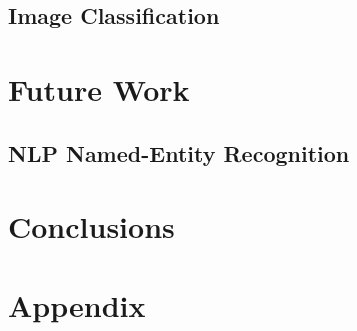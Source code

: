 \documentclass{article}
\numberwithin{equation}{section}
\begin{document}
\subsection{Image Classification}

\newpage
\section{Future Work}
\subsection{NLP Named-Entity Recognition}

\newpage
\section{Conclusions}

\newpage



\newpage
\appendix
\section{Appendix}
\end{document}
